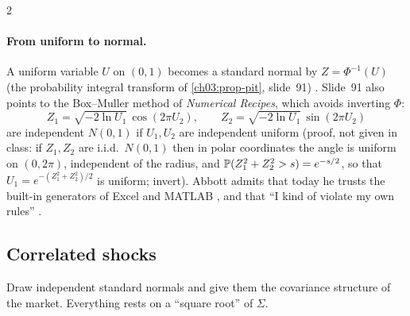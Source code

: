 \begin{paracol}{2}
\paragraph{From uniform to normal.} A uniform variable $U$ on $(0,1)$ becomes a standard normal by $Z=\Phi^{-1}(U)$ (the probability integral transform of \cref{ch03:prop-pit}, slide~91) . Slide~91 also points to the Box--Muller method of \emph{Numerical Recipes}, which avoids inverting $\Phi$:
\[
  Z_1=\sqrt{-2\ln U_1}\,\cos(2\pi U_2),\qquad Z_2=\sqrt{-2\ln U_1}\,\sin(2\pi U_2)
\]
are independent $N(0,1)$ if $U_1,U_2$ are independent uniform (proof, not given in class: if $Z_1,Z_2$ are i.i.d.\ $N(0,1)$ then in polar coordinates the angle is uniform on $(0,2\pi)$, independent of the radius, and $\mathbb{P}(Z_1^2+Z_2^2>s)=e^{-s/2}$, so that $U_1=e^{-(Z_1^2+Z_2^2)/2}$ is uniform; invert). Abbott admits that today he trusts the built-in generators of Excel and MATLAB , and that ``I kind of violate my own rules'' .

\subsection{Correlated shocks}
Draw independent standard normals and give them the covariance structure of the market. Everything rests on a ``square root'' of $\Sigma$.


\end{paracol}
